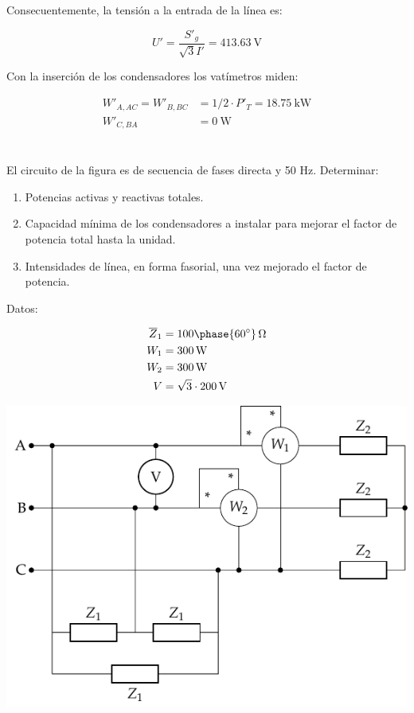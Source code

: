 \documentclass[12pt]{article}
\begin{document}
Consecuentemente, la tensión a la entrada de la línea es:

\[
U' = \frac{S'_g}{\sqrt{3} I'} = \SI{413.63}{\volt}
\]

Con la inserción de los condensadores los vatímetros miden:

\begin{align*}
W'_{A, AC} = W'_{B, BC} &= 1/2 \cdot P'_T = \SI{18.75}{\kilo\watt}\\
W'_{C, BA} &= \SI{0}{\watt}
\end{align*}

\clearpage

\section{}

El circuito de la figura es de secuencia de fases directa y 50 Hz. Determinar:
\begin{enumerate}
\item Potencias activas y reactivas totales.
\item Capacidad mínima de los condensadores a instalar para mejorar el factor de potencia total hasta la unidad.
\item Intensidades de línea, en forma fasorial, una vez mejorado el factor de potencia.
\end{enumerate}
Datos: 

\begin{align*}
  \overline{Z}_1 &= \SI[parse-numbers=false]{100\phase{\ang{60}}}{\ohm}\\
  W_1 &= \SI{300}{\watt}\\
  W_2 &= \SI{300}{\watt}\\
  V &= \SI[parse-numbers=false]{\sqrt{3} \cdot 200}{\volt}
\end{align*}

\begin{center}
  \includegraphics{figs/ZyZt}
\end{center}
\end{document}
